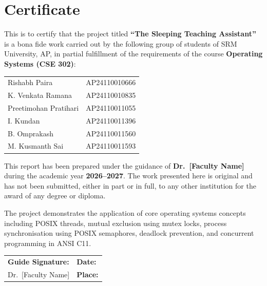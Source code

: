 \documentclass[12pt,a4paper]{report}
\begin{document}
\chapter*{Certificate}

This is to certify that the project titled \textbf{``The Sleeping Teaching Assistant''} is a
bona fide work carried out by the following group of students of SRM University, AP, in partial
fulfillment of the requirements of the course \textbf{Operating Systems (CSE 302)}:

\vspace{0.4cm}
\begin{tabular}{ll}
  Rishabh Paira         & AP24110010666 \\
  K. Venkata Ramana     & AP24110010835 \\
  Preetimohan Pratihari & AP24110011055 \\
  I. Kundan             & AP24110011396 \\
  B. Omprakash          & AP24110011560 \\
  M. Kusmanth Sai       & AP24110011593 \\
\end{tabular}
\vspace{0.4cm}

This report has been prepared under the guidance of \textbf{Dr.\ [Faculty Name]} during the
academic year \textbf{2026--2027}. The work presented here is original and has not been
submitted, either in part or in full, to any other institution for the award of any degree or
diploma.

The project demonstrates the application of core operating systems concepts including POSIX
threads, mutual exclusion using mutex locks, process synchronisation using POSIX semaphores,
deadlock prevention, and concurrent programming in ANSI C11.

\vspace{2.5cm}

\begin{tabular}{p{6cm} p{6cm}}
  \textbf{Guide Signature:} \hrulefill & \textbf{Date:} \hrulefill \\[1.6cm]
  Dr.\ [Faculty Name] & \textbf{Place:} \hrulefill \\
\end{tabular}

\clearpage

\end{document}
